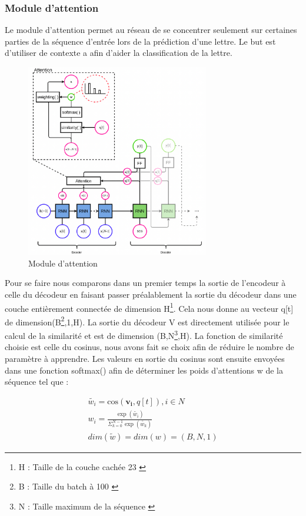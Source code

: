     \subsubsection{Module d'attention}
        
        Le module d'attention permet au réseau de se concentrer seulement sur certaines parties de la séquence d'entrée lors de la prédiction d'une lettre. Le but est d'utiliser de contexte a afin d'aider la classification de la lettre. 
        
        \begin{figure}[!ht]
            \centering
            \includegraphics[width=80mm]{sections/images/architecture/attention_base.png}
            \caption{Module d'attention}
            \label{fig:Figure 6  }
        \end{figure}
        
        Pour se faire nous comparons dans un premier temps la sortie de l'encodeur à celle du décodeur en faisant passer préalablement la sortie du décodeur dans une couche entièrement connectée de dimension H\footnote{H : Taille de la couche cachée 23 \label{H}}. Cela nous donne au vecteur q[t] de dimension(B\footnote{B : Taille du batch à 100 \label{B}},1,H). La sortie du décodeur V est directement utilisée pour le calcul de la similarité et est de dimension (B,N\footnote{N : Taille maximum de la séquence \label{N}},H). La fonction de similarité choisie est celle du cosinus, nous avons fait se choix afin de réduire le nombre de paramètre à apprendre. Les valeurs en sortie du cosinus sont ensuite envoyées dans une fonction softmax() afin de déterminer les poids d'attentions w de la séquence tel que :
        
        \begin{align}
            \tilde{w_{i}}=\mathrm{cos}\left(\mathbf{v_{i}},q[t]\right), i \in N \\
            w_{i}=\frac{\exp \left(\tilde{w_{i}}\right)}{\Sigma_{k=0}^{N-1} \exp \left(\tilde{w_{k}}\right)} \\
            dim(\tilde{w})=dim(w)=(B,N,1)
        \end{align}
        
